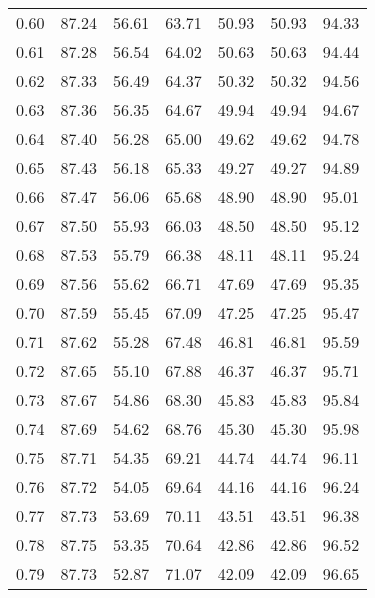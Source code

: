 \begin{tabular}{|c|c|c|c|c|c|c|}
      0.60 &     87.24 &     56.61 &      63.71 &   50.93 &      50.93 &         94.33 \\
      0.61 &     87.28 &     56.54 &      64.02 &   50.63 &      50.63 &         94.44 \\
      0.62 &     87.33 &     56.49 &      64.37 &   50.32 &      50.32 &         94.56 \\
      0.63 &     87.36 &     56.35 &      64.67 &   49.94 &      49.94 &         94.67 \\
      0.64 &     87.40 &     56.28 &      65.00 &   49.62 &      49.62 &         94.78 \\
      0.65 &     87.43 &     56.18 &      65.33 &   49.27 &      49.27 &         94.89 \\
      0.66 &     87.47 &     56.06 &      65.68 &   48.90 &      48.90 &         95.01 \\
      0.67 &     87.50 &     55.93 &      66.03 &   48.50 &      48.50 &         95.12 \\
      0.68 &     87.53 &     55.79 &      66.38 &   48.11 &      48.11 &         95.24 \\
      0.69 &     87.56 &     55.62 &      66.71 &   47.69 &      47.69 &         95.35 \\
      0.70 &     87.59 &     55.45 &      67.09 &   47.25 &      47.25 &         95.47 \\
      0.71 &     87.62 &     55.28 &      67.48 &   46.81 &      46.81 &         95.59 \\
      0.72 &     87.65 &     55.10 &      67.88 &   46.37 &      46.37 &         95.71 \\
      0.73 &     87.67 &     54.86 &      68.30 &   45.83 &      45.83 &         95.84 \\
      0.74 &     87.69 &     54.62 &      68.76 &   45.30 &      45.30 &         95.98 \\
      0.75 &     87.71 &     54.35 &      69.21 &   44.74 &      44.74 &         96.11 \\
      0.76 &     87.72 &     54.05 &      69.64 &   44.16 &      44.16 &         96.24 \\
      0.77 &     87.73 &     53.69 &      70.11 &   43.51 &      43.51 &         96.38 \\
      0.78 &     87.75 &     53.35 &      70.64 &   42.86 &      42.86 &         96.52 \\
      0.79 &     87.73 &     52.87 &      71.07 &   42.09 &      42.09 &         96.65 \\

\end{tabular}
